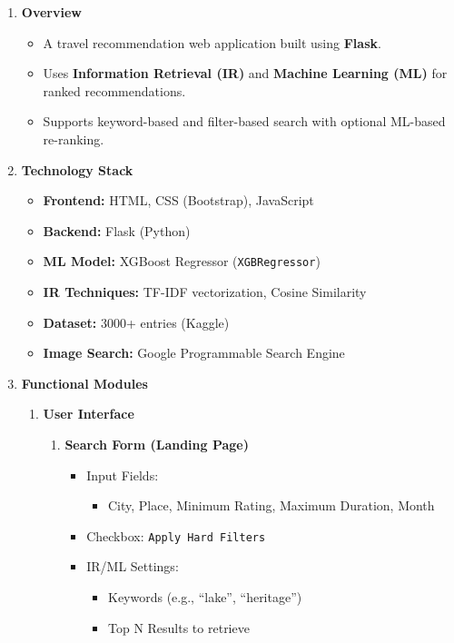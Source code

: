 \documentclass[12pt,a4paper]{article}
\begin{document}
\begin{enumerate}
    \item \textbf{Overview}
    \begin{itemize}
        \item A travel recommendation web application built using \textbf{Flask}.
        \item Uses \textbf{Information Retrieval (IR)} and \textbf{Machine Learning (ML)} for ranked recommendations.
        \item Supports keyword-based and filter-based search with optional ML-based re-ranking.
    \end{itemize}

    \item \textbf{Technology Stack}
    \begin{itemize}
        \item \textbf{Frontend:} HTML, CSS (Bootstrap), JavaScript
        \item \textbf{Backend:} Flask (Python)
        \item \textbf{ML Model:} XGBoost Regressor (\texttt{XGBRegressor})
        \item \textbf{IR Techniques:} TF-IDF vectorization, Cosine Similarity
        \item \textbf{Dataset:} 3000+ entries (Kaggle)
        \item \textbf{Image Search:} Google Programmable Search Engine
    \end{itemize}

    \item \textbf{Functional Modules}
    \begin{enumerate}
        \item \textbf{User Interface}
        \begin{enumerate}
            \item \textbf{Search Form (Landing Page)}
            \begin{itemize}
                \item Input Fields:
                \begin{itemize}
                    \item City, Place, Minimum Rating, Maximum Duration, Month
                \end{itemize}
                \item Checkbox: \texttt{Apply Hard Filters}
                \item IR/ML Settings:
                \begin{itemize}
                    \item Keywords (e.g., ``lake'', ``heritage'')
                    \item Top N Results to retrieve
                \end{itemize}
            \end{itemize}


\end{enumerate}
\end{enumerate}
\end{enumerate}
\end{document}

